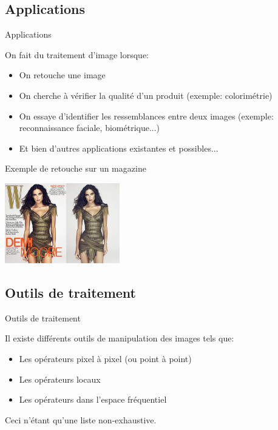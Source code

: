 \documentclass[french]{beamer}
\begin{document}
        \subsection{Applications}
            \begin{frame}{Applications}
               \tableofcontents[sectionstyle=show/hide,subsectionstyle=show/shaded/hide]
            \end{frame}
            \begin{frame}
                On fait du traitement d'image lorsque:
                \begin{itemize}
                    \item On retouche une image
                    \item On cherche à vérifier la qualité d'un produit (exemple: colorimétrie)
                    \item On essaye d'identifier les ressemblances entre deux images (exemple: reconnaissance faciale, biométrique...)
                    \item Et bien d'autres applications existantes et possibles...
                \end{itemize}
            \end{frame}
            \begin{frame}
                \begin{exampleblock}{Exemple de retouche sur un magazine}
                    \begin{center}
	                    \includegraphics[width=5cm]{retouche_magazine.jpg}
	                \end{center}
            	\end{exampleblock}
            \end{frame}
        \subsection{Outils de traitement}
            \begin{frame}{Outils de traitement}
               \tableofcontents[sectionstyle=show/hide,subsectionstyle=show/shaded/hide]
            \end{frame}
            \begin{frame}
            Il existe différents outils de manipulation des images tels que:
                \begin{itemize}
                    \item Les opérateurs pixel à pixel (ou point à point)
                    \item Les opérateurs locaux
                    \item Les opérateurs dans l'espace fréquentiel
                \end{itemize}
                Ceci n'étant qu'une liste non-exhaustive.
            \end{frame}
\end{document}
